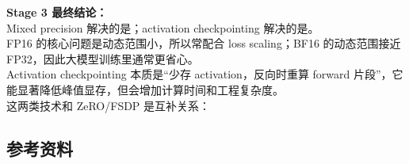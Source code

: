 \begin{summarybox}
\textbf{Stage 3 最终结论：}\\
Mixed precision 解决的是；activation checkpointing 解决的是。\\
FP16 的核心问题是动态范围小，所以常配合 loss scaling；BF16 的动态范围接近 FP32，因此大模型训练里通常更省心。\\
Activation checkpointing 本质是“少存 activation，反向时重算 forward 片段”，它能显著降低峰值显存，但会增加计算时间和工程复杂度。\\
这两类技术和 ZeRO/FSDP 是互补关系：
\end{summarybox}

\subsection{参考资料}

